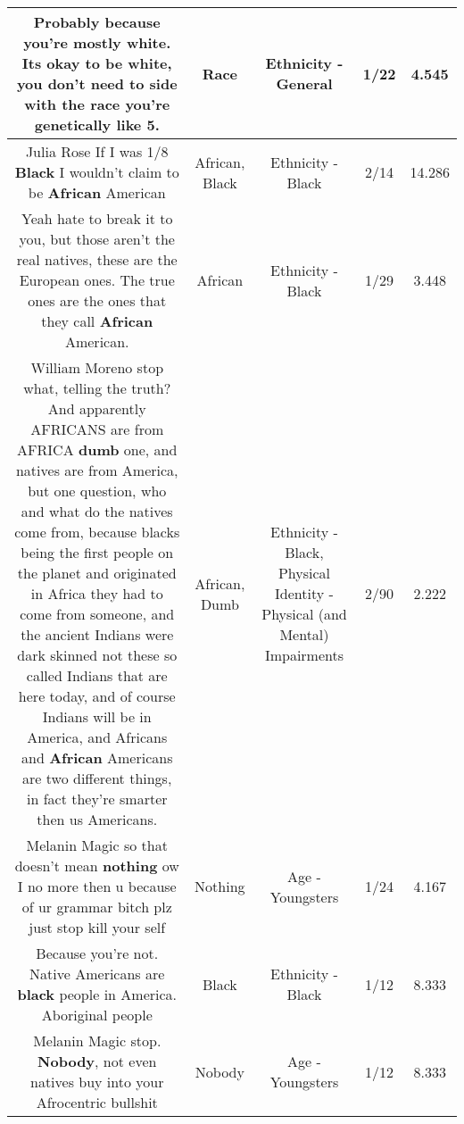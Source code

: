 \documentclass[11pt]{article}
\newlength\mylength
\begin{document}
\begin{center}
\begin{longtable}{|C{.65\mylength}|C{.30\mylength}|C{.12\mylength}|C{.12\mylength}|C{.12\mylength}|}
  \small Probably because you're mostly white. Its okay to be white, you don't need to side with the \textbf{race} you're genetically like 5.\normalsize   & Race & Ethnicity - General & 1/22 & 4.545 \\  \hline
  \small Julia Rose If I was 1/8 \textbf{Black} I wouldn't claim to be \textbf{African} American\normalsize   & African, Black & Ethnicity - Black & 2/14 & 14.286 \\  \hline
  \small Yeah hate to break it to you, but those aren't the real natives, these are the European ones.  The true ones are the ones that they call \textbf{African} American.\normalsize   & African & Ethnicity - Black & 1/29 & 3.448 \\  \hline
  \small William Moreno stop what, telling the truth? And apparently AFRICANS are from AFRICA \textbf{dumb} one, and natives are from America, but one question, who and what do the natives come from, because blacks being the first people on the planet and originated in Africa they had to come from someone, and the ancient Indians were dark skinned not these so called Indians that are here today, and of course Indians will be in America, and Africans and \textbf{African} Americans are two different things, in fact they're smarter then us Americans.\normalsize   & African, Dumb & Ethnicity - Black, Physical Identity - Physical (and Mental) Impairments & 2/90 & 2.222 \\  \hline
  \small Melanin Magic so that doesn't mean \textbf{nothing} ow I no more then u because of ur grammar bitch plz just stop kill your self\normalsize   & Nothing & Age - Youngsters & 1/24 & 4.167 \\  \hline
  \small Because you're not. Native Americans are \textbf{black} people in America. Aboriginal people\normalsize   & Black & Ethnicity - Black & 1/12 & 8.333 \\  \hline
  \small Melanin Magic stop. \textbf{Nobody}, not even natives buy into your Afrocentric bullshit\normalsize   & Nobody & Age - Youngsters & 1/12 & 8.333 \\  \hline

\end{longtable}
\end{center}
\end{document}
